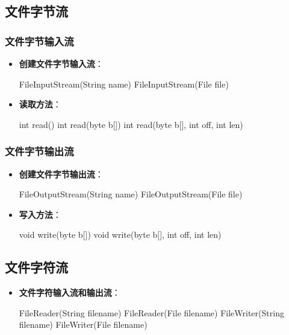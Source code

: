 \documentclass[a4paper, 10pt]{ctexart}
\begin{document}
\subsection{文件字节流}
\subsubsection{文件字节输入流}
\begin{itemize}
  \item \textbf{创建文件字节输入流}：
  \begin{codeblock}
FileInputStream(String name)
FileInputStream(File file)
  \end{codeblock}
  \item \textbf{读取方法}：
  \begin{codeblock}
int read()
int read(byte b[])
int read(byte b[], int off, int len)
  \end{codeblock}
\end{itemize}

\subsubsection{文件字节输出流}
\begin{itemize}
  \item \textbf{创建文件字节输出流}：
  \begin{codeblock}
FileOutputStream(String name)
FileOutputStream(File file)
  \end{codeblock}
  \item \textbf{写入方法}：
  \begin{codeblock}
void write(byte b[])
void write(byte b[], int off, int len)
  \end{codeblock}
\end{itemize}

\subsection{文件字符流}
\begin{itemize}
  \item \textbf{文件字符输入流和输出流}：
  \begin{codeblock}
FileReader(String filename)
FileReader(File filename)
FileWriter(String filename)
FileWriter(File filename)
  \end{codeblock}
\end{itemize}
\end{document}
